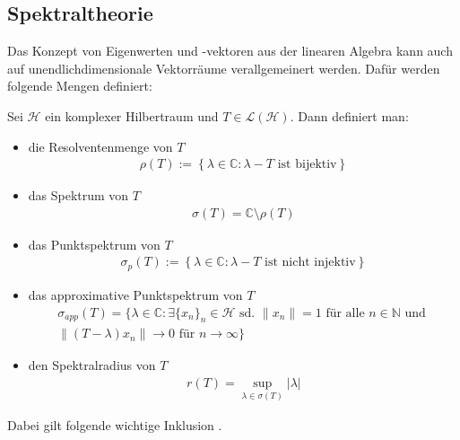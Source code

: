 \subsection{Spektraltheorie}

Das Konzept von Eigenwerten und -vektoren aus der linearen Algebra kann auch auf unendlichdimensionale Vektorräume verallgemeinert werden. Dafür werden folgende Mengen definiert:

\begin{definition}
    Sei $\mathcal{H}$ ein komplexer Hilbertraum und $T\in \mathcal{L}(\mathcal{H})$. Dann definiert man: \begin{itemize}
        \item die Resolventenmenge von $T$ \begin{align*}
            \rho(T) := \left\{ \lambda \in \mathbb{C}: \lambda -T \text{ ist bijektiv} \right\}
        \end{align*}
        \item das Spektrum von $T$
        \begin{align*}
            \sigma(T)=\mathbb{C} \setminus \rho(T)
        \end{align*}
        
        \item das Punktspektrum von $T$ 
        \begin{align*}
            \sigma_{p}(T) := \left\{ \lambda \in \mathbb{C}: \lambda -T \text{ ist nicht injektiv} \right\}
        \end{align*}
        \item das approximative Punktspektrum von $T$ 
        \begin{align*}
            \sigma_{app}(T)=\{ \lambda \in \mathbb{C}: \exists \{x_n\}_n \in \mathcal{H} \text{ sd. } \|x_n\|=1  \text{ für alle $n\in\mathbb{N}$ und } \\ 
            \|(T-\lambda)x_n \| \rightarrow 0 \text{ für } n \rightarrow \infty \}
        \end{align*}
        \item den Spektralradius von $T$ \begin{align*}
            r(T)=\sup_{\lambda \in \sigma(T)} |\lambda|
        \end{align*}
    \end{itemize}
\end{definition}

Dabei gilt folgende wichtige Inklusion \parencite[][Problem 78]{halmos2012hilbert}.

